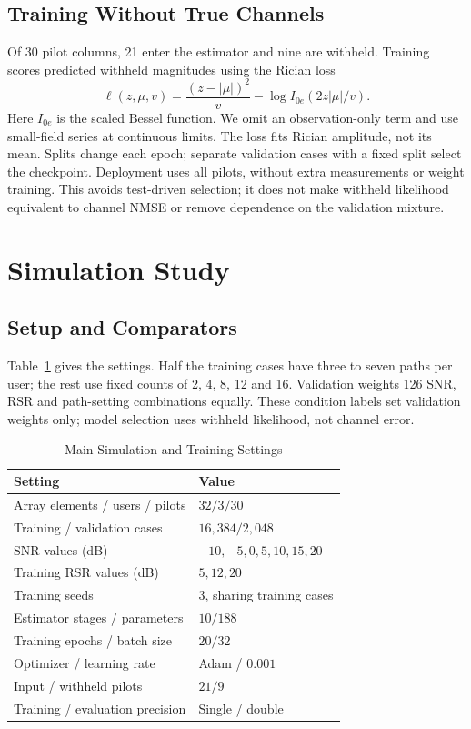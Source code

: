 \documentclass[journal]{IEEEtran}
\begin{document}
\subsection{Training Without True Channels}
Of 30 pilot columns, 21 enter the estimator and nine are withheld.
Training scores predicted withheld magnitudes using the Rician loss
\begin{equation}
 \ell(z,\mu,v)=\frac{(z-|\mu|)^2}{v}-\log I_{0e}(2z|\mu|/v).
\end{equation}
Here $I_{0e}$ is the scaled Bessel function. We omit an observation-only
term and use small-field series at continuous limits. The loss fits
Rician amplitude, not its mean. Splits change each epoch; separate
validation cases with a fixed split select the checkpoint. Deployment
uses all pilots, without extra measurements or weight training.
This avoids test-driven selection; it does not make withheld likelihood
equivalent to channel NMSE or remove dependence on the validation mixture.

\section{Simulation Study}
\subsection{Setup and Comparators}
Table~\ref{tab:setup} gives the settings. Half the training cases have
three to seven paths per user; the rest use fixed counts of 2, 4, 8, 12
and 16. Validation weights 126 SNR, RSR and path-setting combinations
equally. These condition labels set validation weights only; model
selection uses withheld likelihood, not channel error.

\begin{table}[!t]
\caption{Main Simulation and Training Settings}\label{tab:setup}
\centering\small
\begin{tabular}{@{}ll@{}}\toprule
Setting & Value\\\midrule
Array elements / users / pilots & $32/3/30$\\
Training / validation cases & $16{,}384/2{,}048$\\
SNR values (dB) & $-10,-5,0,5,10,15,20$\\
Training RSR values (dB) & $5,12,20$\\
Training seeds & 3, sharing training cases\\
Estimator stages / parameters & $10/188$\\
Training epochs / batch size & $20/32$\\
Optimizer / learning rate & Adam / $0.001$\\
Input / withheld pilots & $21/9$\\
Training / evaluation precision & Single / double\\\bottomrule
\end{tabular}
\end{table}
\end{document}
